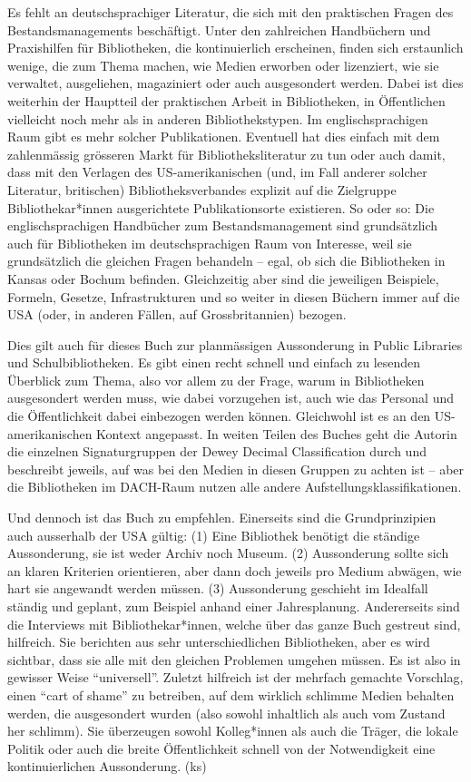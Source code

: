 \documentclass[a4paper,
fontsize=11pt,
oneside,
numbers=noperiodatend,
parskip=half-,
bibliography=totoc,
final
]{scrartcl}
\begin{document}
Es fehlt an deutschsprachiger Literatur, die sich mit den praktischen
Fragen des Bestandsmanagements beschäftigt. Unter den zahlreichen
Handbüchern und Praxishilfen für Bibliotheken, die kontinuierlich
erscheinen, finden sich erstaunlich wenige, die zum Thema machen, wie
Medien erworben oder lizenziert, wie sie verwaltet, ausgeliehen,
magaziniert oder auch ausgesondert werden. Dabei ist dies weiterhin der
Hauptteil der praktischen Arbeit in Bibliotheken, in Öffentlichen
vielleicht noch mehr als in anderen Bibliothekstypen. Im
englischsprachigen Raum gibt es mehr solcher Publikationen. Eventuell
hat dies einfach mit dem zahlenmässig grösseren Markt für
Bibliotheksliteratur zu tun oder auch damit, dass mit den Verlagen des
US-amerikanischen (und, im Fall anderer solcher Literatur, britischen)
Bibliotheksverbandes explizit auf die Zielgruppe Bibliothekar*innen
ausgerichtete Publikationsorte existieren. So oder so: Die
englischsprachigen Handbücher zum Bestandsmanagement sind grundsätzlich
auch für Bibliotheken im deutschsprachigen Raum von Interesse, weil sie
grundsätzlich die gleichen Fragen behandeln -- egal, ob sich die
Bibliotheken in Kansas oder Bochum befinden. Gleichzeitig aber sind die
jeweiligen Beispiele, Formeln, Gesetze, Infrastrukturen und so weiter in
diesen Büchern immer auf die USA (oder, in anderen Fällen, auf
Grossbritannien) bezogen.

Dies gilt auch für dieses Buch zur planmässigen Aussonderung in Public
Libraries und Schulbibliotheken. Es gibt einen recht schnell und einfach
zu lesenden Überblick zum Thema, also vor allem zu der Frage, warum in
Bibliotheken ausgesondert werden muss, wie dabei vorzugehen ist, auch
wie das Personal und die Öffentlichkeit dabei einbezogen werden können.
Gleichwohl ist es an den US-amerikanischen Kontext angepasst. In weiten
Teilen des Buches geht die Autorin die einzelnen Signaturgruppen der
Dewey Decimal Classification durch und beschreibt jeweils, auf was bei
den Medien in diesen Gruppen zu achten ist -- aber die Bibliotheken im
DACH-Raum nutzen alle andere Aufstellungsklassifikationen.

Und dennoch ist das Buch zu empfehlen. Einerseits sind die
Grundprinzipien auch ausserhalb der USA gültig: (1) Eine Bibliothek
benötigt die ständige Aussonderung, sie ist weder Archiv noch Museum.
(2) Aussonderung sollte sich an klaren Kriterien orientieren, aber dann
doch jeweils pro Medium abwägen, wie hart sie angewandt werden müssen.
(3) Aussonderung geschieht im Idealfall ständig und geplant, zum
Beispiel anhand einer Jahresplanung. Andererseits sind die Interviews
mit Bibliothekar*innen, welche über das ganze Buch gestreut sind,
hilfreich. Sie berichten aus sehr unterschiedlichen Bibliotheken, aber
es wird sichtbar, dass sie alle mit den gleichen Problemen umgehen
müssen. Es ist also in gewisser Weise \enquote{universell}. Zuletzt
hilfreich ist der mehrfach gemachte Vorschlag, einen \enquote{cart of
shame} zu betreiben, auf dem wirklich schlimme Medien behalten werden,
die ausgesondert wurden (also sowohl inhaltlich als auch vom Zustand her
schlimm). Sie überzeugen sowohl Kolleg*innen als auch die Träger, die
lokale Politik oder auch die breite Öffentlichkeit schnell von der
Notwendigkeit eine kontinuierlichen Aussonderung. (ks)
\end{document}
